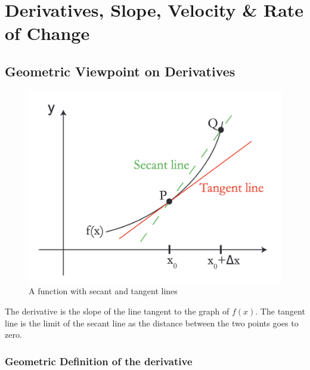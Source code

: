 

\chapter{Derivatives, Slope, Velocity \& Rate of Change}  

\bigbreak
\section{Geometric Viewpoint on Derivatives}

\begin{figure}[ht!]
	\centering
	\includegraphics[scale=0.3]{./images/lecture_1_figure_1.png}
	\caption{A function with secant and tangent lines}
\end{figure}

The derivative is the slope of the line tangent to the graph of $f(x)$.
The tangent line is the limit of the secant line as the distance between the two points goes to zero.

\subsection{Geometric Definition of the derivative}


